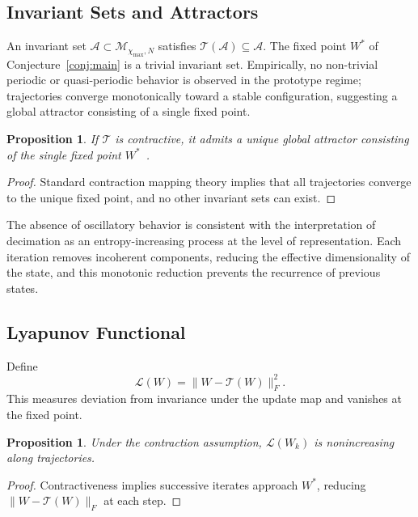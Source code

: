 \documentclass[11pt]{article}
\newtheorem{proposition}[theorem]{Proposition}
\theoremstyle{definition}
\begin{document}
\subsection{Invariant Sets and Attractors}

An invariant set $\mathcal{A} \subset \mathcal{M}_{\chi_{\max},N}$ satisfies
$\mathcal{T}(\mathcal{A}) \subseteq \mathcal{A}$. The fixed point $W^*$ of
Conjecture~\ref{conj:main} is a trivial invariant set. Empirically, no
non-trivial periodic or quasi-periodic behavior is observed in the prototype
regime; trajectories converge monotonically toward a stable configuration,
suggesting a global attractor consisting of a single fixed point.

\begin{proposition}
  If $\mathcal{T}$ is contractive, it admits a unique global attractor
  consisting of the single fixed point $W^*$~\cite{maclane1998}.
\end{proposition}

\begin{proof}
  Standard contraction mapping theory implies that all trajectories converge to
  the unique fixed point, and no other invariant sets can exist.
\end{proof}

The absence of oscillatory behavior is consistent with the interpretation of
decimation as an entropy-increasing process at the level of representation.
Each iteration removes incoherent components, reducing the effective
dimensionality of the state, and this monotonic reduction prevents the
recurrence of previous states.

\subsection{Lyapunov Functional}

Define
\begin{equation}
  \mathcal{L}(W) = \|W - \mathcal{T}(W)\|_F^2.
\end{equation}
This measures deviation from invariance under the update map and vanishes at the
fixed point.

\begin{proposition}
  Under the contraction assumption, $\mathcal{L}(W_k)$ is nonincreasing along
  trajectories.
\end{proposition}

\begin{proof}
  Contractiveness implies successive iterates approach $W^*$, reducing
  $\|W - \mathcal{T}(W)\|_F$ at each step.
\end{proof}
\end{document}

